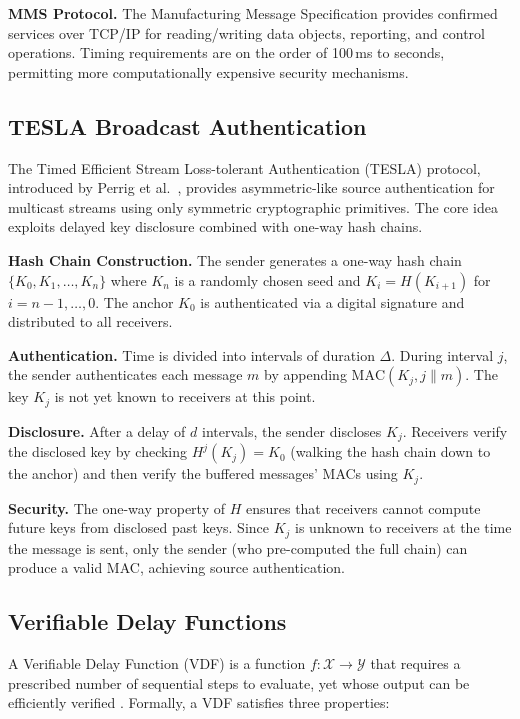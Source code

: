 \documentclass[conference,10pt]{IEEEtran}
\begin{document}
\textbf{MMS Protocol.} The Manufacturing Message Specification provides confirmed services over TCP/IP for reading/writing data objects, reporting, and control operations. Timing requirements are on the order of 100\,ms to seconds, permitting more computationally expensive security mechanisms.

\subsection{TESLA Broadcast Authentication}

The Timed Efficient Stream Loss-tolerant Authentication (TESLA) protocol, introduced by Perrig et al.\ \cite{perrig2000tesla,perrig2002tesla}, provides asymmetric-like source authentication for multicast streams using only symmetric cryptographic primitives. The core idea exploits delayed key disclosure combined with one-way hash chains.

\textbf{Hash Chain Construction.} The sender generates a one-way hash chain $\{K_0, K_1, \ldots, K_n\}$ where $K_n$ is a randomly chosen seed and $K_i = H(K_{i+1})$ for $i = n-1, \ldots, 0$. The anchor $K_0$ is authenticated via a digital signature and distributed to all receivers.

\textbf{Authentication.} Time is divided into intervals of duration $\Delta$. During interval $j$, the sender authenticates each message $m$ by appending $\text{MAC}(K_j, j \| m)$. The key $K_j$ is not yet known to receivers at this point.

\textbf{Disclosure.} After a delay of $d$ intervals, the sender discloses $K_j$. Receivers verify the disclosed key by checking $H^{j}(K_j) = K_0$ (walking the hash chain down to the anchor) and then verify the buffered messages' MACs using $K_j$.

\textbf{Security.} The one-way property of $H$ ensures that receivers cannot compute future keys from disclosed past keys. Since $K_j$ is unknown to receivers at the time the message is sent, only the sender (who pre-computed the full chain) can produce a valid MAC, achieving source authentication.

\subsection{Verifiable Delay Functions}

A Verifiable Delay Function (VDF) is a function $f: \mathcal{X} \to \mathcal{Y}$ that requires a prescribed number of sequential steps to evaluate, yet whose output can be efficiently verified \cite{boneh2018vdf}. Formally, a VDF satisfies three properties:
\end{document}

